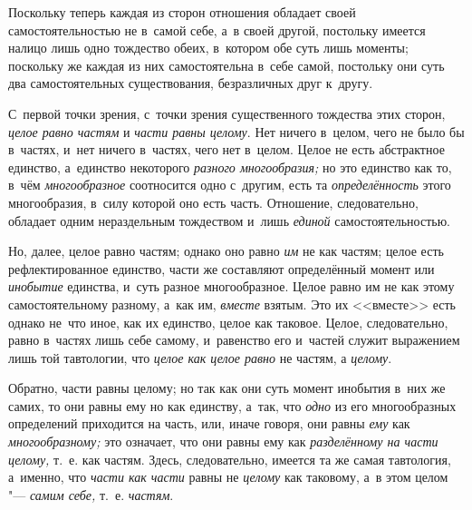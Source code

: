 Поскольку теперь каждая из сторон отношения обладает своей
самостоятельностью не в~самой себе, а~в своей другой, постольку имеется
налицо лишь одно тождество обеих, в~котором обе суть лишь моменты;
поскольку же каждая из них самостоятельна в~себе самой, постольку они суть
два самостоятельных существования, безразличных друг к~другу.

С~первой точки зрения, с~точки зрения существенного тождества этих сторон,
{\em целое равно частям} и {\em части равны целому}. Нет ничего в~целом, чего
не было бы в~частях, и~нет ничего в~частях, чего нет в~целом. Целое не есть
абстрактное единство, а~единство некоторого
{\em разного многообразия;} но это единство как то, в~чём
{\em многообразное} соотносится одно с~другим, есть
та {\em определённость} этого многообразия, в~силу
которой оно есть часть. Отношение, следовательно, обладает одним
нераздельным тождеством и~лишь {\em единой} самостоятельностью.

Но, далее, целое равно частям; однако оно равно {\em им}
не как частям; целое есть рефлектированное единство, части же составляют
определённый момент или {\em инобытие} единства, и~суть
разное многообразное. Целое равно им не как этому самостоятельному разному,
а~как им, {\em вместе} взятым. Это их <<вместе>> есть
однако не~что иное, как их единство, целое как таковое. Целое,
следовательно, равно в~частях лишь себе самому, и~равенство его и~частей
служит выражением лишь той тавтологии, что {\em целое
как целое равно} не частям, а {\em целому}.

Обратно, части равны целому; но так как они суть момент инобытия в~них же
самих, то они равны ему но как единству, а~так, что
{\em одно} из его многообразных определений приходится
на часть, или, иначе говоря, они равны {\em ему} как
{\em многообразному;} это означает, что они равны ему
как {\em разделённому на части целому,} т.~е. как
частям. Здесь, следовательно, имеется та же самая тавтология, а~именно, что
{\em части как части} равны не {\em целому} как таковому, а~в этом целом
"--- {\em самим себе,} т.~е. {\em частям}.

